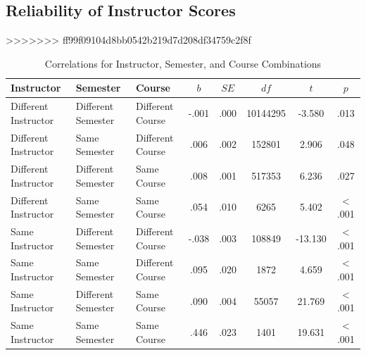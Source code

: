 \documentclass[,man]{apa6}
\theoremstyle{definition}
\theoremstyle{definition}
\theoremstyle{definition}
\theoremstyle{remark}
\begin{document}
\hypertarget{reliability-of-instructor-scores}{%
\subsection{Reliability of Instructor
Scores}\label{reliability-of-instructor-scores}}
>>>>>>> ff99f09104d8bb0542b219d7d208df34759c2f8f

\begin{table}[tbp]
\begin{center}
\begin{threeparttable}
\caption{\label{tab:rel-table}Correlations for Instructor, Semester, and Course Combinations}
\small{
\begin{tabular}{lllccccc}
\toprule
Instructor & Semester & Course & $b$ & $SE$ & $df$ & $t$ & $p$\\
\midrule
Different Instructor & Different Semester & Different Course & -.001 & .000 & 10144295 & -3.580 & .013\\
Different Instructor & Same Semester & Different Course & .006 & .002 & 152801 & 2.906 & .048\\
Different Instructor & Different Semester & Same Course & .008 & .001 & 517353 & 6.236 & .027\\
Different Instructor & Same Semester & Same Course & .054 & .010 & 6265 & 5.402 & < .001\\
Same Instructor & Different Semester & Different Course & -.038 & .003 & 108849 & -13.130 & < .001\\
Same Instructor & Same Semester & Different Course & .095 & .020 & 1872 & 4.659 & < .001\\
Same Instructor & Different Semester & Same Course & .090 & .004 & 55057 & 21.769 & < .001\\
Same Instructor & Same Semester & Same Course & .446 & .023 & 1401 & 19.631 & < .001\\
\bottomrule
\end{tabular}
}
\end{threeparttable}
\end{center}
\end{table}
\end{document}
